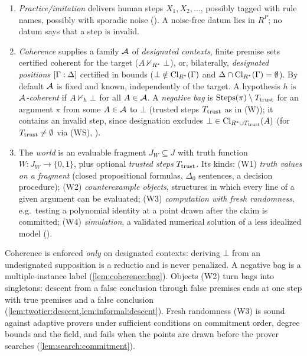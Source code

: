 \begin{definition}\label{def:setting:channels}
\leavevmode
\begin{enumerate}[label=(\Alph*),leftmargin=*]
\item[(P)] \emph{Practice/imitation} delivers human steps $X_1,X_2,\dots$,
  possibly tagged with rule names, possibly with sporadic noise
  (). A noise-free datum lies in $R^P$; no datum says
  that a step is invalid.
\item[(C)] \emph{Coherence} supplies a family $\mathcal{A}$ of \emph{designated contexts},
  finite premise sets certified coherent for the target ($A\nvdash_{R^{*}}\bot$),
  or, bilaterally, \emph{designated positions} $[\Gamma : \Delta]$ certified in
  bounds ($\bot\notin\mathrm{Cl}_{R^{*}}(\Gamma)$ and
  $\Delta\cap\mathrm{Cl}_{R^{*}}(\Gamma)=\emptyset$). By default $\mathcal{A}$ is fixed and
  known, independently of the target. A hypothesis $h$ is \emph{$\mathcal{A}$-coherent}
  if $A\nvdash_h\bot$ for all $A\in\mathcal{A}$. A \emph{negative bag} is
  $\mathrm{Steps}(\pi)\setminus T_{\mathrm{trust}}$ for an argument $\pi$ from some $A\in\mathcal{A}$ to
  $\bot$ (trusted steps $T_{\mathrm{trust}}$ as in (W)); it contains an invalid step, since
  designation excludes $\bot\in\mathrm{Cl}_{R^{*}\cup T_{\mathrm{trust}}}(A)$ (for
  $T_{\mathrm{trust}}\neq\emptyset$ via (WS), ).
\item[(W)] The \emph{world} is an evaluable fragment $J_W\subseteq J$ with truth
  function $W:J_W\to\{0,1\}$, plus optional \emph{trusted steps} $T_{\mathrm{trust}}$. Its
  kinds: (W1) \emph{truth values on a fragment} (closed propositional formulas,
  $\Delta_0$ sentences, a decision procedure); (W2) \emph{counterexample objects},
  structures in which every line of a given argument can be evaluated; (W3)
  \emph{computation with fresh randomness}, e.g.\ testing a polynomial identity at
  a point drawn after the claim is committed; (W4) \emph{simulation}, a validated
  numerical solution of a less idealized model ().
\end{enumerate}
\end{definition}

Coherence is enforced \emph{only} on designated contexts: deriving $\bot$ from an
undesignated supposition is a reductio and is never penalized. A negative bag is a
multiple-instance label (\cref{lem:coherence:bag}). Objects (W2) turn bags into
singletons: descent from a false conclusion through false premises ends at one
step with true premises and a false conclusion
(\cref{lem:twotier:descent,lem:informal:descent}). Fresh randomness (W3) is sound
against adaptive provers under sufficient conditions on commitment order, degree
bounds and the field, and fails when the points are drawn before the prover
searches (\cref{lem:search:commitment}).

